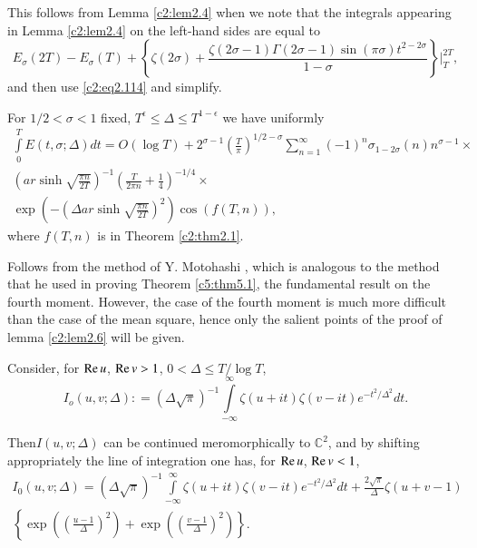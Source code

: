 \medskip
{} This follows from Lemma \ref{c2:lem2.4}
when we note that the integrals appearing in Lemma \ref{c2:lem2.4} on
the left-hand sides are equal to 
$$
E_\sigma (2T) - E_\sigma (T) + \left\{ \zeta (2 \sigma) + \frac{\zeta
  (2 \sigma -1) \Gamma (2 \sigma -1) \sin (\pi \sigma)t^{2 - 2
    \sigma}}{1- \sigma}\right\} \Bigg|_T^{2T},
$$
and then use \eqref{c2:eq2.114} and simplify.

\begin{lemma}\label{c2:lem2.6}
  For $1/2 < \sigma < 1$ fixed, $T^\epsilon \leq \Delta  \leq
  T^{1-\epsilon}$ we have uniformly
  \begin{multline*}
    \int\limits_0^T E(t, \sigma; \Delta ) dt = O(\log T)+
    2^{\sigma-1} \left(\frac{T}{\pi} \right)^{1/2 - \sigma}
    \sum^\infty_{n=1} (-1)^n \sigma_{1- 2 \sigma} (n) n^{\sigma-1}\times\\
    \left( ar \sinh \sqrt{\frac{\pi n}{2T}}\right)^{-1} \left(
      \frac{T}{2 \pi n} + \frac{1}{4}\right)^{- 1/4}\times\\ 
      \exp \left(-\left(\Delta  ar \sinh \sqrt{\frac{\pi
          n}{2T}}\right)^2\right) \cos (f (T, n)),
  \end{multline*}
where $f (T, n)$ is in Theorem \ref{c2:thm2.1}.
\end{lemma}

\medskip
{}  Follows from the method of Y. Motohashi
\cite{Motohashi8}, which is analogous to the method that he used in proving
Theorem \ref{c5:thm5.1}, the fundamental result on the fourth
moment. However, the case of the fourth moment is much more difficult
than the case of the mean square, hence only the salient points of the
proof of lemma \ref{c2:lem2.6} will be given.

Consider, for $\operatorname{Re} u$, $\operatorname{Re} v > 1$, $0< \Delta  \leq T/\log T$,
$$
I_o (u, v; \Delta ): = (\Delta  \sqrt{\pi})^{-1}
\int\limits_{-\infty}^\infty \zeta (u+ it) \zeta (v- it)
e^{-t^2/\Delta ^2} dt.
$$ 

Then\pageoriginale $I (u, v; \Delta )$ can be continued
meromorphically to $\mathbb{C}^2$, and by shifting appropriately the
line of integration one has, for $\operatorname{Re} u$, $\operatorname{Re} v < 1$,
\begin{multline*}
  I_0 (u, v; \Delta ) = (\Delta  \sqrt{\pi})^{-1} \int\limits_{-
    \infty}^\infty \zeta (u+ it) \zeta (v- it) e^{-t^2 / \Delta ^2}
  dt + \frac{2\sqrt{\pi}}{\Delta } \zeta (u+ v-1)\\
   \left\{ \exp \left(
  \left(\frac{u-1}{\Delta } \right)^2\right) + \exp \left(
  \left(\frac{v-1}{\Delta }\right)^2 \right) \right\}. 
\end{multline*}

